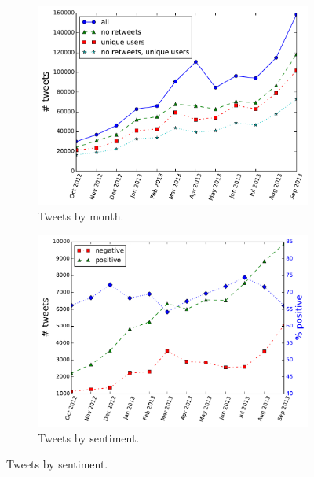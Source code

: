\documentclass{sig-alternate}
\begin{document}


\begin{figure}[t]
  \caption{Tweets by month and sentiment.}
  \begin{subfigure}{.96\columnwidth}
    \centering
    \caption{Tweets by month. \label{f.total}}
    \includegraphics[width=\columnwidth]{nb/raw_counts.pdf}  %
  \end{subfigure}
  \begin{subfigure}{\columnwidth}
    \centering
    \caption{Tweets by sentiment. \label{f.sentiment}}
    \includegraphics[width=\columnwidth]{nb/sentiment.pdf}
  \end{subfigure}
\end{figure}
\end{document}
